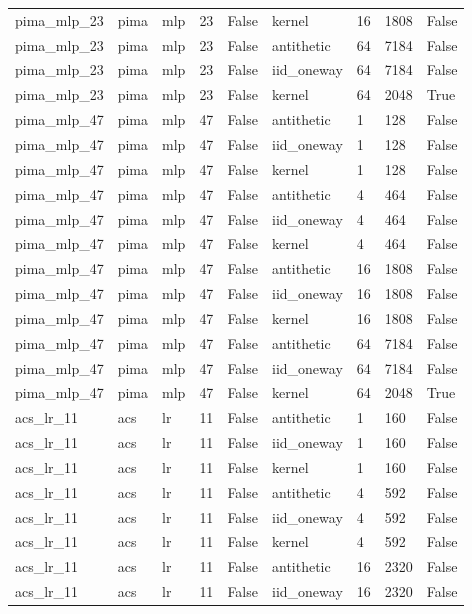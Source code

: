 \begin{tabular}{lllllllll}
pima\_mlp\_23 & pima & mlp & 23 & False & kernel & 16 & 1808 & False \\
pima\_mlp\_23 & pima & mlp & 23 & False & antithetic & 64 & 7184 & False \\
pima\_mlp\_23 & pima & mlp & 23 & False & iid\_oneway & 64 & 7184 & False \\
pima\_mlp\_23 & pima & mlp & 23 & False & kernel & 64 & 2048 & True \\
pima\_mlp\_47 & pima & mlp & 47 & False & antithetic & 1 & 128 & False \\
pima\_mlp\_47 & pima & mlp & 47 & False & iid\_oneway & 1 & 128 & False \\
pima\_mlp\_47 & pima & mlp & 47 & False & kernel & 1 & 128 & False \\
pima\_mlp\_47 & pima & mlp & 47 & False & antithetic & 4 & 464 & False \\
pima\_mlp\_47 & pima & mlp & 47 & False & iid\_oneway & 4 & 464 & False \\
pima\_mlp\_47 & pima & mlp & 47 & False & kernel & 4 & 464 & False \\
pima\_mlp\_47 & pima & mlp & 47 & False & antithetic & 16 & 1808 & False \\
pima\_mlp\_47 & pima & mlp & 47 & False & iid\_oneway & 16 & 1808 & False \\
pima\_mlp\_47 & pima & mlp & 47 & False & kernel & 16 & 1808 & False \\
pima\_mlp\_47 & pima & mlp & 47 & False & antithetic & 64 & 7184 & False \\
pima\_mlp\_47 & pima & mlp & 47 & False & iid\_oneway & 64 & 7184 & False \\
pima\_mlp\_47 & pima & mlp & 47 & False & kernel & 64 & 2048 & True \\
acs\_lr\_11 & acs & lr & 11 & False & antithetic & 1 & 160 & False \\
acs\_lr\_11 & acs & lr & 11 & False & iid\_oneway & 1 & 160 & False \\
acs\_lr\_11 & acs & lr & 11 & False & kernel & 1 & 160 & False \\
acs\_lr\_11 & acs & lr & 11 & False & antithetic & 4 & 592 & False \\
acs\_lr\_11 & acs & lr & 11 & False & iid\_oneway & 4 & 592 & False \\
acs\_lr\_11 & acs & lr & 11 & False & kernel & 4 & 592 & False \\
acs\_lr\_11 & acs & lr & 11 & False & antithetic & 16 & 2320 & False \\
acs\_lr\_11 & acs & lr & 11 & False & iid\_oneway & 16 & 2320 & False \\

\end{tabular}
